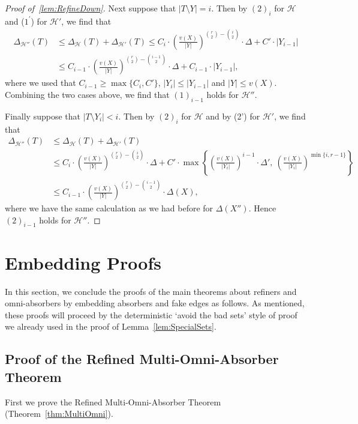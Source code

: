 \documentclass[11pt]{article}
\newcounter{i}
\theoremstyle{plain}
\renewcommand{\theclaim}{\thetheorem.\arabic{claim}}
\newenvironment{lateproof}[1]
 {%
  \renewcommand{\theclaim}{\ref{#1}.\arabic{claim}}%
  \begin{proof}[Proof of~\cref{#1}]%
 }
 {\end{proof}}
\theoremstyle{plain} %
\theoremstyle{definition}
\begin{document}
\begin{lateproof}{lem:RefineDown}
Next suppose that $|T\setminus Y|=i$. Then by $(2)_i$ for $\mathcal{H}$ and ($1^{\prime}$) for $\mathcal{H}'$, we find that
\begin{align*}\Delta_{\mathcal{H}''}(T) &\le \Delta_{\mathcal{H}}(T) + \Delta_{\mathcal{H'}}(T) \le  C_i \cdot \left(\frac{v(X)}{|Y|}\right)^{\binom{r}{2}-\binom{i}{2}} \cdot \Delta+ C' \cdot |Y_{i-1}|\\
&\le C_{i-1} \cdot \left(\frac{v(X)}{|Y|}\right)^{\binom{r}{2}-\binom{i-1}{2}} \cdot \Delta+ C_{i-1} \cdot |Y_{i-1}|,
\end{align*}
where we used that $C_{i-1}\ge \max\{C_{i}, C'\}$, $|Y_i|\le |Y_{i-1}|$ and $|Y|\le v(X)$. Combining the two cases above, we find that $(1)_{i-1}$ holds for $\mathcal{H}''$. 

Finally suppose that $|T\setminus Y_i| < i$. Then by $(2)_i$ for $\mathcal{H}$ and by (2') for $\mathcal{H}'$, we find that \begin{align*}
\Delta_{\mathcal{H}''}(T) &\le \Delta_{\mathcal{H}}(T) + \Delta_{\mathcal{H'}}(T) \\
&\le  C_i \cdot \left(\frac{v(X)}{|Y|}\right)^{\binom{r}{2}-\binom{i}{2}} \cdot \Delta+ C' \cdot \max\left\{\left(\frac{v(X)}{|Y_i|}\right)^{i-1} \cdot \Delta',~\left(\frac{v(X)}{|Y_i|}\right)^{\min\{i,r-1\}}\right\}\\
&\le C_{i-1} \cdot \left(\frac{v(X)}{|Y|}\right)^{\binom{r}{2}-\binom{i-1}{2}} \cdot \Delta(X),
\end{align*}
where we have the same calculation as we had before for $\Delta(X'')$. Hence $(2)_{i-1}$ holds for $\mathcal{H}''$.
\end{lateproof}

\section{Embedding Proofs}\label{s:Embedding}

In this section, we conclude the proofs of the main theorems about refiners and omni-absorbers by embedding absorbers and fake edges as follows. As mentioned, these proofs will proceed by the deterministic `avoid the bad sets' style of proof we already used in the proof of Lemma~\ref{lem:SpecialSets}.

\subsection{Proof of the Refined Multi-Omni-Absorber Theorem}

First we prove the Refined Multi-Omni-Absorber Theorem (Theorem~\ref{thm:MultiOmni}).
\end{document}
